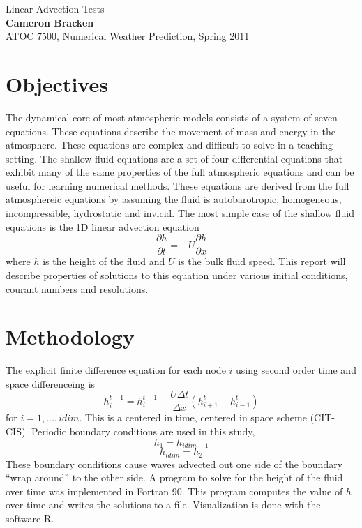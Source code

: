 \documentclass[11pt,twoside]{article}
\newcommand{\p}[2]{\frac{\partial#1}{\partial#2}}
\begin{document}
\thispagestyle{empty}
{\Large Linear Advection Tests}\\
\textbf{Cameron Bracken}\\
ATOC 7500, Numerical Weather Prediction, Spring 2011\\



%
%
\section{Objectives}
The dynamical core of most atmospheric models consists of a system of seven equations.  These equations describe the movement of mass and energy in the atmosphere. These equations are complex and difficult to solve in a teaching setting.  The shallow fluid equations are a set of four differential equations that exhibit many of the same properties of the full atmospheric equations and can be useful for learning numerical methods.  These equations are derived from the full atmosphereic equations by assuming the fluid is autobarotropic, homogeneous, incompressible, hydrostatic and invicid. The most simple case of the shallow fluid equations is the 1D linear advection equation
\[
\p{h}{t} = - U \p{h}{x}
\]
where $h$ is the height of the fluid and $U$ is the bulk fluid speed. This report will describe properties of solutions to this equation under various initial conditions, courant numbers and resolutions. 


%
%
\section{Methodology}

The explicit finite difference equation for each node $i$ using second order time and space differenceing is
$$
h_i^{t+1}=h_i^{t-1}-\frac{U\Delta t}{\Delta x}(h_{i+1}^t-h_{i-1}^t)
$$
for $i = 1,...,idim$.  This is a centered in time, centered in space scheme (CIT-CIS).  Periodic boundary conditions are used in this study,
$$
h_1 = h_{idim-1}
$$$$
h_{idim} = h_2
$$
These boundary conditions cause waves advected out one side of the boundary ``wrap around'' to the other side. A program to solve for the height of the fluid over time was implemented in Fortran 90. This program computes the value of $h$ over time and writes the solutions to a file. Visualization is done with the software \textsf{R}.
\end{document}
